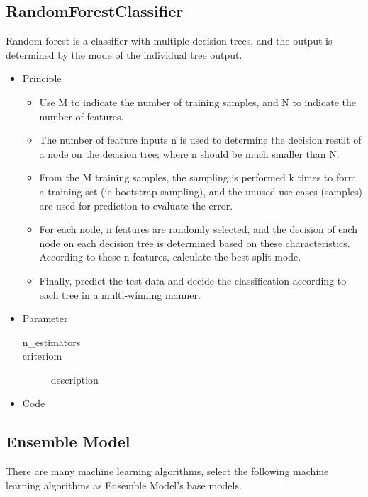 \subsection{RandomForestClassifier}


Random forest is a classifier with 
multiple decision trees, and
the output is determined by 
the mode of the individual tree output.

\begin{itemize}
	\item Principle
	
	\begin{itemize}
		\item Use M to indicate the number of training samples, 
		and N to indicate the number of features.
		\item The number of feature inputs n is 
		used to determine the decision result 
		of a node on the decision tree; 
		where n should be much smaller than N.
		\item From the M training samples, 
		the sampling is performed k times to 
		form a training set (ie bootstrap sampling), 
		and the unused use cases (samples) are 
		used for prediction to evaluate the error.
		\item For each node, 
		n features are randomly selected, 
		and the decision of each node on each decision tree is 
		determined based on these characteristics. 
		According to these n features, 
		calculate the best split mode.
		\item Finally, predict the test data and 
		decide the classification 
		according to each tree in a multi-winning manner.
	\end{itemize}
	
	\item Parameter
	
	\begin{description}
		\item[n_estimators] 
		\item[criteriom] description 
	\end{description}
	
	\item Code
\end{itemize}

\subsection{Ensemble Model}
There are many machine learning algorithms, 
select the following machine learning algorithms as Ensemble Model’s base models. 



